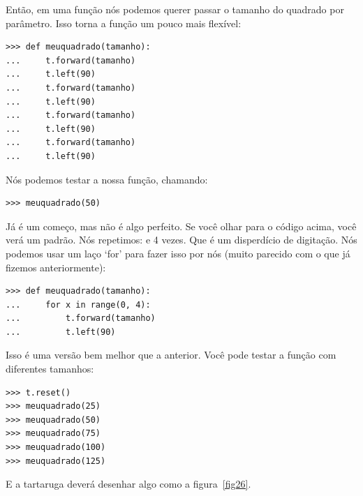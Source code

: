 {Então, em uma função nós podemos querer passar o tamanho do quadrado por parâmetro. Isso torna a função um pouco mais flexível:

\begin{listing}
\begin{verbatim}
>>> def meuquadrado(tamanho):
...     t.forward(tamanho)
...     t.left(90)
...     t.forward(tamanho)
...     t.left(90)
...     t.forward(tamanho)
...     t.left(90)
...     t.forward(tamanho)
...     t.left(90)
\end{verbatim}
\end{listing}

\noindent
Nós podemos testar a nossa função, chamando:

\begin{listing}
\begin{verbatim}
>>> meuquadrado(50)
\end{verbatim}
\end{listing}

Já é um começo, mas não é algo perfeito. Se você olhar para o código acima, você verá um padrão. Nós repetimos:  e  4 vezes. Que é um disperdício de digitação. Nós podemos usar um laço `for' para fazer isso por nós (muito parecido com o que já fizemos anteriormente):

\begin{listing}
\begin{verbatim}
>>> def meuquadrado(tamanho):
...     for x in range(0, 4):
...         t.forward(tamanho)
...         t.left(90)
\end{verbatim}
\end{listing}

Isso é uma versão bem melhor que a anterior. Você pode testar a função com diferentes tamanhos:

\begin{listing}
\begin{verbatim}
>>> t.reset()
>>> meuquadrado(25)
>>> meuquadrado(50)
>>> meuquadrado(75)
>>> meuquadrado(100)
>>> meuquadrado(125)
\end{verbatim}
\end{listing}

E a tartaruga deverá desenhar algo como a figura~\ref{fig26}.

}
